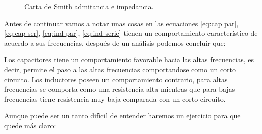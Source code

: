 \documentclass[
	12pt, %
	fleqn, %
	a4paper, %
	oneside, %
]{LegrandOrangeBook}
\begin{document}
\begin{figure}[]
\centering
{}
\caption{Carta de Smith admitancia e impedancia.}
\label{fig:smith chart color}
\end{figure}
Antes de continuar vamos a notar unas cosas en las ecuaciones \ref{eq:cap par}, \ref{eq:cap ser}, \ref{eq:ind par}, \ref{eq:ind serie} tienen un comportamiento característico de acuerdo a sus frecuencias, después de un análisis podemos  concluir que:
\begin{proposition}\label{prop:comp frec}
Los capacitores tiene un comportamiento favorable hacia las altas frecuencias, es decir, permite el paso a las altas frecuencias comportandose como un corto circuito. Los inductores poseen un comportamiento contrario, para altas frecuencias se comporta como una resistencia alta mientras que para bajas frecuencias tiene resistencia muy baja comparada con un corto circuito.
\end{proposition}
Aunque puede ser un tanto difícil de entender haremos un ejercicio para que quede más claro:
\end{document}
